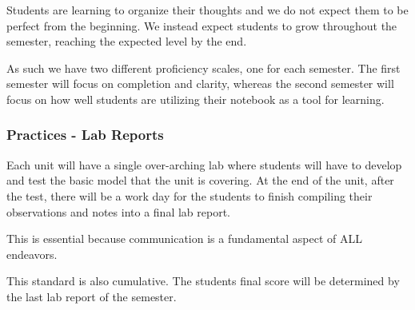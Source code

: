 \documentclass[14pt, fleqn, paper=letter, oneside]{scrartcl}
\begin{document}
\begin{multicols}{2}
Students are learning to organize their thoughts and we do not expect them to be perfect from the beginning.
We instead expect students to grow throughout the semester, reaching the expected level by the end.

As such we have two different proficiency scales, one for each semester.
The first semester will focus on completion and clarity, whereas the second semester will focus on how well students are utilizing their notebook as a tool for learning.

\subsubsection*{Practices - Lab Reports}
Each unit will have a single over-arching lab where students will have to develop and test the basic model that the unit is covering.
At the end of the unit, after the test, there will be a work day for the students to finish compiling their observations and notes into a final lab report.

This is essential because communication is a fundamental aspect of ALL endeavors.

This standard is also cumulative.
The students final score will be determined by the last lab report of the semester.


\end{multicols}
\end{document}
